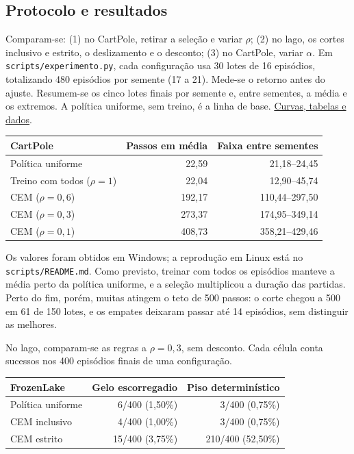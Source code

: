 \documentclass[12pt]{article}
\begin{document}
\subsection{Protocolo e resultados}

Comparam-se: (1) no CartPole, retirar a seleção e variar $\rho$; (2) no lago, os cortes inclusivo e estrito, o deslizamento e o desconto; (3) no CartPole, variar $\alpha$. Em \texttt{scripts/experimento.py}, cada configuração usa 30 lotes de 16 episódios, totalizando 480 episódios por semente (17 a 21). Mede-se o retorno antes do ajuste. Resumem-se os cinco lotes finais por semente e, entre sementes, a média e os extremos. A política uniforme, sem treino, é a linha de base. \href{https://metodo-da-entropia-cruzada.vercel.app/experimento.html}{Curvas, tabelas e dados}.

\begin{center}
\begin{tabular}{lrr}
\toprule
CartPole & Passos em média & Faixa entre sementes\\
\midrule
Política uniforme & 22,59 & 21,18--24,45\\
Treino com todos ($\rho=1$) & 22,04 & 12,90--45,74\\
CEM ($\rho=0{,}6$) & 192,17 & 110,44--297,50\\
CEM ($\rho=0{,}3$) & 273,37 & 174,95--349,14\\
CEM ($\rho=0{,}1$) & 408,73 & 358,21--429,46\\
\bottomrule
\end{tabular}
\end{center}

Os valores foram obtidos em Windows; a reprodução em Linux está no \texttt{scripts/README.md}. Como previsto, treinar com todos os episódios manteve a média perto da política uniforme, e a seleção multiplicou a duração das partidas. Perto do fim, porém, muitas atingem o teto de 500 passos: o corte chegou a 500 em 61 de 150 lotes, e os empates deixaram passar até 14 episódios, sem distinguir as melhores.


No lago, comparam-se as regras a $\rho=0{,}3$, sem desconto. Cada célula conta sucessos nos 400 episódios finais de uma configuração.
\begin{center}
\begin{tabular}{lrr}
\toprule
FrozenLake & Gelo escorregadio & Piso determinístico\\
\midrule
Política uniforme & 6/400 (1,50\%) & 3/400 (0,75\%)\\
CEM inclusivo & 4/400 (1,00\%) & 3/400 (0,75\%)\\
CEM estrito & 15/400 (3,75\%) & 210/400 (52,50\%)\\
\bottomrule
\end{tabular}
\end{center}
\end{document}
